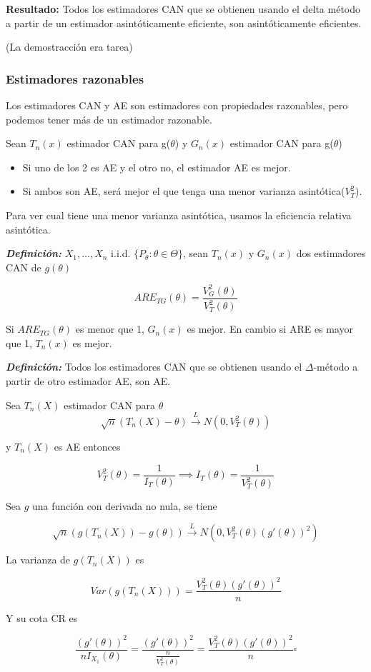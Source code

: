 \textbf{Resultado: }Todos los estimadores CAN que se obtienen usando el delta método a partir de un estimador asintóticamente eficiente,
son asintóticamente eficientes.

(La demostracción era tarea)

\subsubsection{Estimadores razonables}

Los estimadores CAN y AE son estimadores con propiedades razonables, pero podemos tener más de un estimador razonable.

Sean $T_n(x)$ estimador CAN para g($\theta$) y $G_n(x)$ estimador CAN para g($\theta$)
\begin{itemize}
    \item Si uno de los 2 es AE y el otro no, el estimador AE es mejor.
    \item Si ambos son AE, será mejor el que tenga una menor varianza asintótica($V_T^2$).
\end{itemize}

Para ver cual tiene una menor varianza asintótica, usamos la eficiencia relativa asintótica.

\textbf{\textit{Definición: }} $X_1,\dots,X_n$ i.i.d. $\{ P_\theta: \theta \in \Theta \}$, sean $T_n(x)$
y $G_n(x)$ dos estimadores CAN de $g(\theta)$

\[
    ARE_{TG}(\theta)=\frac{V_G^2(\theta)}{V_T^2(\theta)}
\]

Si $ARE_{TG}(\theta)$ es menor que 1, $G_n(x)$ es mejor. En cambio si ARE es mayor que 1, $T_n(x)$ es mejor.

\newpage

\textbf{\textit{Definición: }} Todos los estimadores CAN que se obtienen usando el $\Delta$-método a partir de otro estimador AE, son AE.

\begin{proofs}
    Sea $T_n(X)$ estimador CAN para $\theta$
    \[
        \sqrt{n}(T_n(X)-\theta) \overset{L}{\to}N(0,V^2_T(\theta))
    \]

    y $T_n(X)$ es AE entonces

    \[
        V^2_T(\theta) = \frac{1}{I_T(\theta)} \implies I_T(\theta)=\frac{1}{V^2_T(\theta)}
    \]

    Sea $g$ una función con derivada no nula, se tiene

    \[
        \sqrt{n}(g(T_n(X))-g(\theta)) \overset{L}{\to}N(0,V^2_T(\theta)(g'(\theta))^2)
    \]

    La varianza de $g(T_n(X))$ es

    \[
        Var(g(T_n(X)))=\frac{V^2_T(\theta)(g'(\theta))^2}{n}
    \]

    Y su cota CR es

    \[
        \frac{(g'(\theta))^2}{nI_{X_1}(\theta)}=\frac{(g'(\theta))^2}{\frac{n}{V^2_T(\theta)}}=\frac{V^2_T(\theta)(g'(\theta))^2}{n}\square
    \]
\end{proofs}
